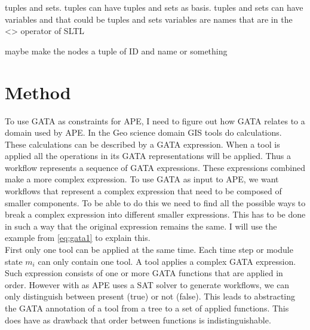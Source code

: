 \documentclass{article}
\begin{document}
tuples and sets.
tuples can have tuples and sets as basis. 
tuples and sets can have variables and that could be tuples and sets
variables are names that are in the <> operator of SLTL 

maybe make the nodes a tuple of ID and name or something






\section{Method}

To use GATA as constraints for APE, I need to figure out how GATA relates to a domain used by APE. In the Geo science domain GIS tools do calculations. These calculations can be described by a GATA expression. When a tool is applied all the operations in its GATA representations will be applied. Thus a workflow represents a sequence of GATA expressions. These expressions combined make a more complex expression. To use GATA as input to APE, we want workflows that represent a complex expression that need to be composed of smaller components. To be able to do this we need to find all the possible ways to break a complex expression into different smaller expressions. This has to be done in such a way that the original expression remains the same. I will use the example from \ref{eq:gata1} to explain this. 
\\

First only one tool can be applied at the same time. Each time step or module state $m_i$ can only contain one tool. A tool applies a complex GATA expression. Such expression consists of one or more GATA functions that are applied in order. However with as APE uses a SAT solver to generate workflows, we can only distinguish between present (true) or not (false).  This leads to abstracting the GATA annotation of a tool from a tree to a set of applied functions. This does have as drawback that order between functions is indistinguishable.  
\end{document}
